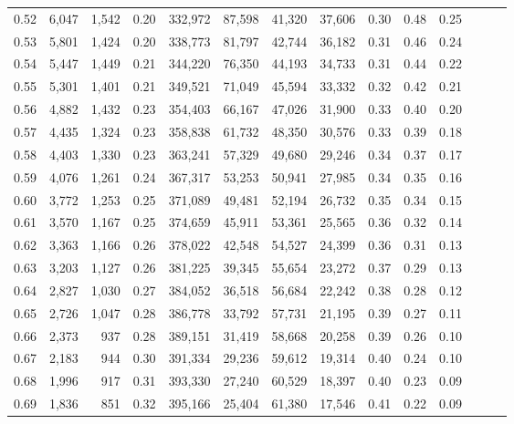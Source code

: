 \begin{tabular}{rrrrrrrrrrrrrr}
0.52 &   6,047 &  1,542 &  0.20 &  332,972 &   87,598 &  41,320 &  37,606 &  0.30 &  0.48 &      0.25 \\
0.53 &   5,801 &  1,424 &  0.20 &  338,773 &   81,797 &  42,744 &  36,182 &  0.31 &  0.46 &      0.24 \\
0.54 &   5,447 &  1,449 &  0.21 &  344,220 &   76,350 &  44,193 &  34,733 &  0.31 &  0.44 &      0.22 \\
0.55 &   5,301 &  1,401 &  0.21 &  349,521 &   71,049 &  45,594 &  33,332 &  0.32 &  0.42 &      0.21 \\
0.56 &   4,882 &  1,432 &  0.23 &  354,403 &   66,167 &  47,026 &  31,900 &  0.33 &  0.40 &      0.20 \\
0.57 &   4,435 &  1,324 &  0.23 &  358,838 &   61,732 &  48,350 &  30,576 &  0.33 &  0.39 &      0.18 \\
0.58 &   4,403 &  1,330 &  0.23 &  363,241 &   57,329 &  49,680 &  29,246 &  0.34 &  0.37 &      0.17 \\
0.59 &   4,076 &  1,261 &  0.24 &  367,317 &   53,253 &  50,941 &  27,985 &  0.34 &  0.35 &      0.16 \\
0.60 &   3,772 &  1,253 &  0.25 &  371,089 &   49,481 &  52,194 &  26,732 &  0.35 &  0.34 &      0.15 \\
0.61 &   3,570 &  1,167 &  0.25 &  374,659 &   45,911 &  53,361 &  25,565 &  0.36 &  0.32 &      0.14 \\
0.62 &   3,363 &  1,166 &  0.26 &  378,022 &   42,548 &  54,527 &  24,399 &  0.36 &  0.31 &      0.13 \\
0.63 &   3,203 &  1,127 &  0.26 &  381,225 &   39,345 &  55,654 &  23,272 &  0.37 &  0.29 &      0.13 \\
0.64 &   2,827 &  1,030 &  0.27 &  384,052 &   36,518 &  56,684 &  22,242 &  0.38 &  0.28 &      0.12 \\
0.65 &   2,726 &  1,047 &  0.28 &  386,778 &   33,792 &  57,731 &  21,195 &  0.39 &  0.27 &      0.11 \\
0.66 &   2,373 &    937 &  0.28 &  389,151 &   31,419 &  58,668 &  20,258 &  0.39 &  0.26 &      0.10 \\
0.67 &   2,183 &    944 &  0.30 &  391,334 &   29,236 &  59,612 &  19,314 &  0.40 &  0.24 &      0.10 \\
0.68 &   1,996 &    917 &  0.31 &  393,330 &   27,240 &  60,529 &  18,397 &  0.40 &  0.23 &      0.09 \\
0.69 &   1,836 &    851 &  0.32 &  395,166 &   25,404 &  61,380 &  17,546 &  0.41 &  0.22 &      0.09 \\

\end{tabular}
